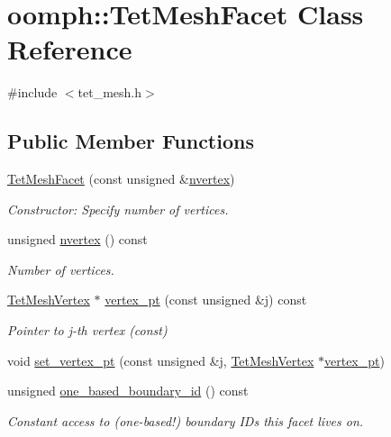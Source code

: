 \hypertarget{classoomph_1_1TetMeshFacet}{}\section{oomph\+:\+:Tet\+Mesh\+Facet Class Reference}
\label{classoomph_1_1TetMeshFacet}


{\ttfamily \#include $<$tet\+\_\+mesh.\+h$>$}

\subsection*{Public Member Functions}
\begin{DoxyCompactItemize}
\item 
\hyperlink{classoomph_1_1TetMeshFacet_add77aa70a861eb137b09db7d5a2c0636}{Tet\+Mesh\+Facet} (const unsigned \&\hyperlink{classoomph_1_1TetMeshFacet_aa6f08ddc938cd6a52f601c63831148ea}{nvertex})
\begin{DoxyCompactList}\small\item\em Constructor\+: Specify number of vertices. \end{DoxyCompactList}\item 
unsigned \hyperlink{classoomph_1_1TetMeshFacet_aa6f08ddc938cd6a52f601c63831148ea}{nvertex} () const
\begin{DoxyCompactList}\small\item\em Number of vertices. \end{DoxyCompactList}\item 
\hyperlink{classoomph_1_1TetMeshVertex}{Tet\+Mesh\+Vertex} $\ast$ \hyperlink{classoomph_1_1TetMeshFacet_a0a745d4bdd17eb45b437d8ef7c8b349a}{vertex\+\_\+pt} (const unsigned \&j) const
\begin{DoxyCompactList}\small\item\em Pointer to j-\/th vertex (const) \end{DoxyCompactList}\item 
void \hyperlink{classoomph_1_1TetMeshFacet_a08ca13e75ab395de75eab807d2f680b5}{set\+\_\+vertex\+\_\+pt} (const unsigned \&j, \hyperlink{classoomph_1_1TetMeshVertex}{Tet\+Mesh\+Vertex} $\ast$\hyperlink{classoomph_1_1TetMeshFacet_a0a745d4bdd17eb45b437d8ef7c8b349a}{vertex\+\_\+pt})
\item 
unsigned \hyperlink{classoomph_1_1TetMeshFacet_a77738b43364fd6f1196e47928f57de65}{one\+\_\+based\+\_\+boundary\+\_\+id} () const
\begin{DoxyCompactList}\small\item\em Constant access to (one-\/based!) boundary I\+Ds this facet lives on. \end{DoxyCompactList}\item 

\end{DoxyCompactItemize}
